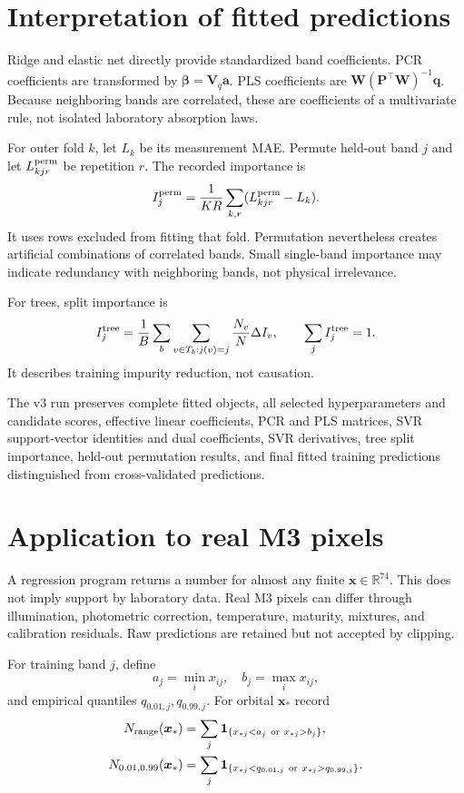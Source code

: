 \documentclass[11pt]{article}
\newcommand{\R}{\mathbb{R}}
\begin{document}
\section{Interpretation of fitted predictions}
Ridge and elastic net directly provide standardized band coefficients. PCR coefficients are transformed by $\bm\beta=\bm V_q\bm a$. PLS coefficients are $\bm W(\bm P^\top\bm W)^{-1}\bm q$. Because neighboring bands are correlated, these are coefficients of a multivariate rule, not isolated laboratory absorption laws.

For outer fold $k$, let $L_k$ be its measurement MAE. Permute held-out band $j$ and let $L_{kjr}^{\rm perm}$ be repetition $r$. The recorded importance is
\begin{equation}
 I_j^{\rm perm}=\frac1{KR}\sum_{k,r}(L_{kjr}^{\rm perm}-L_k).
\end{equation}
It uses rows excluded from fitting that fold. Permutation nevertheless creates artificial combinations of correlated bands. Small single-band importance may indicate redundancy with neighboring bands, not physical irrelevance.

For trees, split importance is
\begin{equation}
 I_j^{\rm tree}=\frac1B\sum_b
 \sum_{v\in T_b:j(v)=j}\frac{N_v}{N}\Delta I_v,
 \qquad \sum_jI_j^{\rm tree}=1.
\end{equation}
It describes training impurity reduction, not causation.

The v3 run preserves complete fitted objects, all selected hyperparameters and candidate scores, effective linear coefficients, PCR and PLS matrices, SVR support-vector identities and dual coefficients, SVR derivatives, tree split importance, held-out permutation results, and final fitted training predictions distinguished from cross-validated predictions.

\section{Application to real M3 pixels}
A regression program returns a number for almost any finite $\bm x\in\R^{74}$. This does not imply support by laboratory data. Real M3 pixels can differ through illumination, photometric correction, temperature, maturity, mixtures, and calibration residuals. Raw predictions are retained but not accepted by clipping.

For training band $j$, define
\begin{equation}
 a_j=\min_i x_{ij},\quad b_j=\max_i x_{ij},
\end{equation}
and empirical quantiles $q_{0.01,j},q_{0.99,j}$. For orbital $\bm x_*$ record
\begin{align}
 N_{\rm range}(\bm x_*)&=\sum_j\mathbf1_{\{x_{*j}<a_j\ \text{or}\ x_{*j}>b_j\}},\\
 N_{0.01,0.99}(\bm x_*)&=\sum_j\mathbf1_{\{x_{*j}<q_{0.01,j}\ \text{or}\ x_{*j}>q_{0.99,j}\}}.
\end{align}
\end{document}
